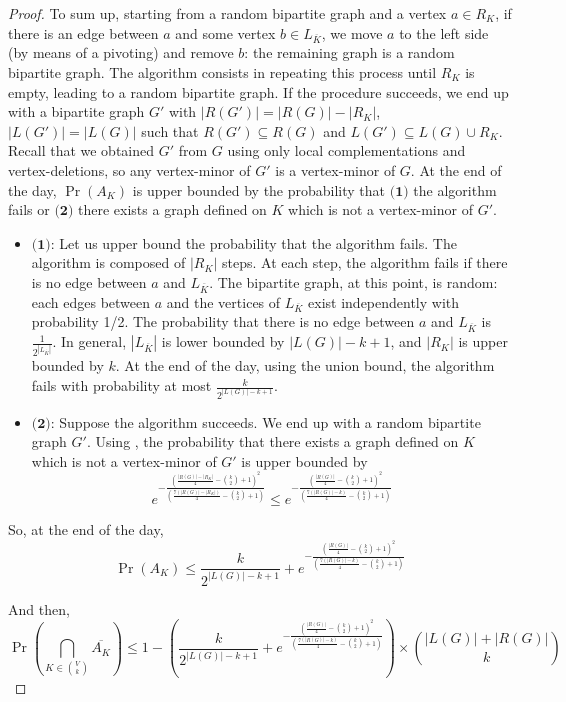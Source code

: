 \documentclass[a4paper,UKenglish,cleveref, autoref, thm-restate]{arxiv}
\newcommand{\se}{\subseteq}
\newcommand{\ls}{\leqslant}
\begin{document}
\begin{proof}
    To sum up, starting from a random bipartite graph and a vertex $a\in R_K$, if there is an edge between $a$ and some vertex $b\in L_{\overline K}$, we move $a$ to the left side (by means of a pivoting) and remove $b$: the remaining graph is a random bipartite graph. The algorithm consists in repeating this process until $R_K$ is empty, leading to a random bipartite graph. If the procedure succeeds, we end up with a bipartite graph $G'$ with $|R(G')|=|R(G)|-|R_K|$, $|L(G')|=|L(G)|$ such that $R(G') \se R(G)$ and $L(G') \se L(G) \cup R_K$. Recall that we obtained $G'$ from $G$ using only local complementations and vertex-deletions, so any vertex-minor of $G'$ is a vertex-minor of $G$. At the end of the day, $\Pr(A_K)$ is upper bounded by the probability that $\textbf{(1)}$ the algorithm fails or $\textbf{(2)}$ there exists a graph defined on $K$ which is not a vertex-minor of $G'$.
    \begin{itemize}
        \item $\textbf{(1)}$: Let us upper bound the probability that the algorithm fails. The algorithm is composed of $|R_K|$ steps. At each step, the algorithm fails if there is no edge between $a$ and $L_{\overline K}$. The bipartite graph, at this point, is random: each edges between $a$ and the vertices of $L_{\overline K}$ exist independently with probability 1/2. The probability that there is no edge between $a$ and $L_{\overline K}$ is $\frac{1}{2^{|L_{\overline K}|}}$.  In general, $|L_{\overline K}|$ is lower bounded by $|L(G)|-k+1$, and $|R_K|$ is upper bounded by $k$. At the end of the day, using the union bound, the algorithm fails with probability at most $\frac{k}{2^{|L(G)|-k+1}}$. 
        \item $\textbf{(2)}$: Suppose the algorithm succeeds. We end up with a random bipartite graph $G'$. Using , the probability that there exists a graph defined on $K$ which is not a vertex-minor of $G'$ is upper bounded by $$e^{-\frac{\left(\frac{|R(G)|-|R_K|}{4}-{k \choose 2}+1\right)^2}{\left(\frac{7(|R(G)|-|R_K|)}{4}-{k \choose 2}+1\right)}} \ls e^{-\frac{\left(\frac{|R(G)|}{4}-{k \choose 2}+1\right)^2}{\left(\frac{7(|R(G)|-k)}{4}-{k \choose 2}+1\right)}}$$
    \end{itemize}

    So, at the end of the day, $$ \Pr(A_K) \ls \frac{k}{2^{|L(G)|-k+1}} + e^{-\frac{\left(\frac{|R(G)|}{4}-{k \choose 2}+1\right)^2}{\left(\frac{7(|R(G)|-k)}{4}-{k \choose 2}+1\right)}}$$

    And then,
    $$\Pr\left( \bigcap_{K \in {V \choose k}} \overline{A_K}\right)  \ls 1 - \left( \frac{k}{2^{|L(G)|-k+1}} + e^{-\frac{\left(\frac{|R(G)|}{4}-{k \choose 2}+1\right)^2}{\left(\frac{7(|R(G)|-k)}{4}-{k \choose 2}+1\right)}}\right)\times {|L(G)|+|R(G)| \choose k}$$

\end{proof}
\end{document}

